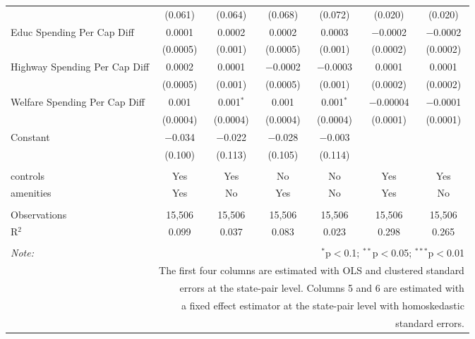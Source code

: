 \begin{table}[!htbp]
\begin{tabular}{@{\extracolsep{5pt}}lcccccc}
  & (0.061) & (0.064) & (0.068) & (0.072) & (0.020) & (0.020) \\ 
  Educ Spending Per Cap Diff & 0.0001 & 0.0002 & 0.0002 & 0.0003 & $-$0.0002 & $-$0.0002 \\ 
  & (0.0005) & (0.001) & (0.0005) & (0.001) & (0.0002) & (0.0002) \\ 
  Highway Spending Per Cap Diff & 0.0002 & 0.0001 & $-$0.0002 & $-$0.0003 & 0.0001 & 0.0001 \\ 
  & (0.0005) & (0.001) & (0.0005) & (0.001) & (0.0002) & (0.0002) \\ 
  Welfare Spending Per Cap Diff & 0.001 & 0.001$^{*}$ & 0.001 & 0.001$^{*}$ & $-$0.00004 & $-$0.0001 \\ 
  & (0.0004) & (0.0004) & (0.0004) & (0.0004) & (0.0001) & (0.0001) \\ 
  Constant & $-$0.034 & $-$0.022 & $-$0.028 & $-$0.003 &  &  \\ 
  & (0.100) & (0.113) & (0.105) & (0.114) &  &  \\ 
 \hline \\[-1.8ex] 
controls & Yes & Yes & No & No & Yes & Yes \\ 
amenities & Yes & No & Yes & No & Yes & No \\ 
\hline \\[-1.8ex] 
Observations & 15,506 & 15,506 & 15,506 & 15,506 & 15,506 & 15,506 \\ 
R$^{2}$ & 0.099 & 0.037 & 0.083 & 0.023 & 0.298 & 0.265 \\ 
\hline 
\hline \\[-1.8ex] 
\textit{Note:}  & \multicolumn{6}{r}{$^{*}$p$<$0.1; $^{**}$p$<$0.05; $^{***}$p$<$0.01} \\ 
 & \multicolumn{6}{r}{The first four columns are estimated with OLS and clustered standard} \\ 
 & \multicolumn{6}{r}{ errors at the state-pair level. Columns 5 and 6 are estimated with} \\ 
 & \multicolumn{6}{r}{a fixed effect estimator at the state-pair level with homoskedastic} \\ 
 & \multicolumn{6}{r}{standard errors.} \\ 
\end{tabular} 
\end{table} 
